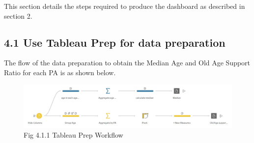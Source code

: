 \documentclass[
  letterpaper,
  DIV=11,
  numbers=noendperiod,
  oneside]{scrartcl}
\begin{document}
This section details the steps required to produce the dashboard as
described in section 2.

\hypertarget{use-tableau-prep-for-data-preparation}{%
\subsection{4.1 Use Tableau Prep for data
preparation}\label{use-tableau-prep-for-data-preparation}}

The flow of the data preparation to obtain the Median Age and Old Age
Support Ratio for each PA is as shown below.

\begin{figure}

{\centering \includegraphics{images/flow-01.jpg}

}

\caption{Fig 4.1.1 Tableau Prep Workflow}

\end{figure}
\end{document}
